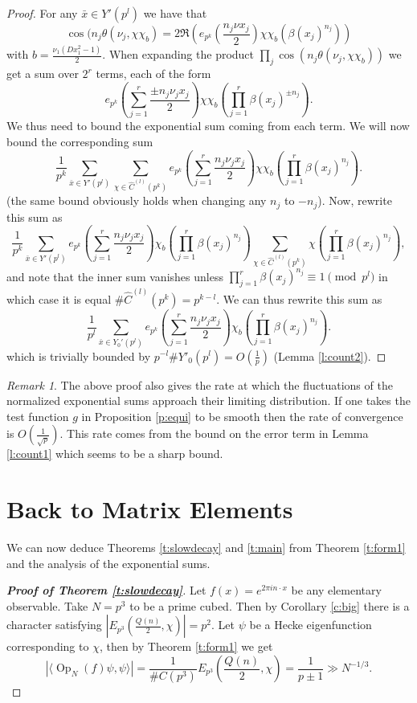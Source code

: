 \documentclass[12pt]{amsart}
\theoremstyle{definition}
\theoremstyle{remark}
\newtheorem{rem}{Remark}[section]
\numberwithin{equation}{section}
\newcommand{\Op}{ \operatorname{Op}}
\begin{document}
\begin{proof}
For any $\bar{x}\in Y'(p^l)$ we have that
\[\cos(n_j\theta(\nu_j,\chi\chi_b)=2\Re(e_{p^k}(\frac{n_j \nu x_j}{2})\chi\chi_b(\beta(x_j)^{n_j}))\]
with $b=\frac{\nu_1(Dx_1^2-1)}{2}$. When expanding the product
$\prod_{j}\cos(n_j\theta(\nu_j,\chi\chi_b))$ we get a sum over $2^r$
terms, each of the form
$$e_{p^k}(\sum_{j=1}^r
\frac{\pm n_j \nu_j x_j}{2})\chi\chi_b(\prod_{j=1}^r\beta(x_j)^{\pm
n_j}).$$ We thus need to bound the exponential sum coming from each
term. We will now bound the corresponding sum
\[\frac{1}{p^k}\sum_{\bar{x}\in Y'(p^l)}\sum_{\chi\in \hat
C^{(l)}(p^k)}e_{p^k}(\sum_{j=1}^r\frac{ n_j \nu_j
x_j}{2})\chi\chi_b(\prod_{j=1}^r\beta(x_j)^{ n_j}).\] (the same
bound obviously holds when changing any $n_j$ to $-n_j$). Now, rewrite
this sum as
\[\frac{1}{p^k}\sum_{\bar{x}\in Y'(p^l)}e_{p^k}
(\sum_{j=1}^r\frac{n_j \nu_j
x_j}{2})\chi_b(\prod_{j=1}^r\beta(x_j)^{n_j})\sum_{\chi\in \hat
C^{(l)}(p^k)}\chi(\prod_{j=1}^r\beta(x_j)^{n_j}),\] and note that
the inner sum vanishes unless $\prod_{j=1}^r\beta(x_j)^{n_j}\equiv
1\pmod {p^l}$ in which case it is equal $\#\hat
C^{(l)}(p^k)=p^{k-l}$. We can thus rewrite this sum as
\[\frac{1}{p^l}\sum_{\bar{x}\in Y_0'(p^l)}e_{p^k}
(\sum_{j=1}^r\frac{n_j \nu_j
x_j}{2})\chi_b(\prod_{j=1}^r\beta(x_j)^{n_j}).\] which is trivially
bounded by $p^{-l}\# Y'_0(p^l)=O(\frac{1}{p})$ (Lemma
\ref{l:count2}).
\end{proof}
\begin{rem}
The above proof also gives the rate at which the fluctuations of the
normalized exponential sums approach their limiting distribution. If
one takes the test function $g$ in Proposition \ref{p:equi} to be
smooth then the rate of convergence is $O(\frac{1}{\sqrt{p}})$. This
rate comes from the bound on the error term in Lemma \ref{l:count1}
which seems to be a sharp bound.
\end{rem}
\section{Back to Matrix Elements} \label{s:equi}
We can now deduce Theorems \ref{t:slowdecay} and \ref{t:main} from
Theorem \ref{t:form1} and the analysis of the exponential sums.

\begin{proof}[\bf{Proof of Theorem \ref{t:slowdecay}}]
Let $f(x)=e^{2\pi i n\cdot x}$ be any elementary observable. Take
$N=p^3$ to be a prime cubed. Then by Corollary \ref{c:big} there is
a character satisfying $|E_{p^3}(\frac{Q(n)}{2},\chi)|=p^2$. Let
$\psi$ be a Hecke eigenfunction corresponding to $\chi$, then by
Theorem \ref{t:form1} we get
\[|\langle \Op_{N}(f)\psi,\psi\rangle|=\frac{1}{\# C(p^3)}E_{p^3}(\frac{Q(n)}{2},\chi)=\frac{1}{p\pm 1}\gg N^{-1/3}.\]
\end{proof}
\end{document}
